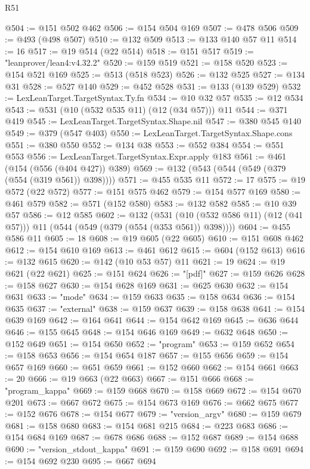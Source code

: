 \begin{lexlean}{R51}
\begin{coremodule}
@504 := @151 @502 @462
@506 := @154 @504 @169
@507 := @478 @506
@509 := @493 (@498 @507)
@510 := @132 @509
@513 := @133 @140 @57 @11
@514 := 16
@517 := @19 @514 (@22 @514)
@518 := @151 @517
@519 := "leanprover/lean4:v4.32.2"
@520 := @159 @519
@521 := @158 @520
@523 := @154 @521 @169
@525 := @513 (@518 @523)
@526 := @132 @525
@527 := @134 @31
@528 := @527 @140
@529 := @452 @528
@531 := @133 (@139 @529)
@532 := LexLeanTarget.TargetSyntax.Ty.fn
@534 := @10 @32 @57
@535 := @12 @534
@543 := @531 (@10 (@532 @535 @11) (@12 (@34 @57))) @11
@544 := @371 @419
@545 := LexLeanTarget.TargetSyntax.Shape.nil
@547 := @380 @545 @140
@549 := @379 (@547 @403)
@550 := LexLeanTarget.TargetSyntax.Shape.cons
@551 := @380 @550
@552 := @134 @38
@553 := @552 @384
@554 := @551 @553
@556 := LexLeanTarget.TargetSyntax.Expr.apply @183
@561 := @461 (@154 (@556 (@404 @427)) @389)
@569 := @132 (@543 (@544 (@549 (@379 (@554 (@319 @561)) @398))))
@571 := @455 @535 @11
@572 := 17
@575 := @19 @572 (@22 @572)
@577 := @151 @575 @462
@579 := @154 @577 @169
@580 := @461 @579
@582 := @571 (@152 @580)
@583 := @132 @582
@585 := @10 @39 @57
@586 := @12 @585
@602 := @132
    (@531 (@10 (@532 @586 @11) (@12 (@41 @57))) @11 (@544 (@549 (@379 (@554 (@353 @561)) @398))))
@604 := @455 @586 @11
@605 := 18
@608 := @19 @605 (@22 @605)
@610 := @151 @608 @462
@612 := @154 @610 @169
@613 := @461 @612
@615 := @604 (@152 @613)
@616 := @132 @615
@620 := @142 (@10 @53 @57) @11
@621 := 19
@624 := @19 @621 (@22 @621)
@625 := @151 @624
@626 := "[pdf]"
@627 := @159 @626
@628 := @158 @627
@630 := @154 @628 @169
@631 := @625 @630
@632 := @154 @631
@633 := "mode"
@634 := @159 @633
@635 := @158 @634
@636 := @154 @635
@637 := "external"
@638 := @159 @637
@639 := @158 @638
@641 := @154 @639 @169
@642 := @164 @641
@644 := @154 @642 @169
@645 := @636 @644
@646 := @155 @645
@648 := @154 @646 @169
@649 := @632 @648
@650 := @152 @649
@651 := @154 @650
@652 := "program"
@653 := @159 @652
@654 := @158 @653
@656 := @154 @654 @187
@657 := @155 @656
@659 := @154 @657 @169
@660 := @651 @659
@661 := @152 @660
@662 := @154 @661
@663 := 20
@666 := @19 @663 (@22 @663)
@667 := @151 @666
@668 := "program_kappa"
@669 := @159 @668
@670 := @158 @669
@672 := @154 @670 @201
@673 := @667 @672
@675 := @154 @673 @169
@676 := @662 @675
@677 := @152 @676
@678 := @154 @677
@679 := "version_argv"
@680 := @159 @679
@681 := @158 @680
@683 := @154 @681 @215
@684 := @223 @683
@686 := @154 @684 @169
@687 := @678 @686
@688 := @152 @687
@689 := @154 @688
@690 := "version_stdout_kappa"
@691 := @159 @690
@692 := @158 @691
@694 := @154 @692 @230
@695 := @667 @694

\end{coremodule}
\end{lexlean}
